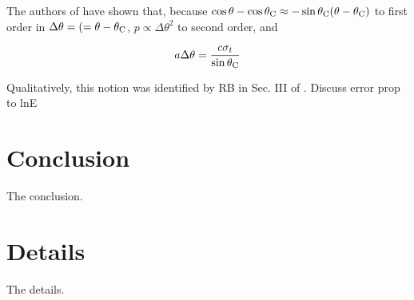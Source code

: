 \documentclass[amsmath,amssymb,aps,prd,10pt,twocolumn,showkeys]{revtex4}
\begin{document}
\begin{itemize}
The authors of \cite{PhysRevD.105.123019} have shown that, because $\cos\theta - \cos\theta_{\rm C} \approx -\sin\theta_{\rm C}(\theta-\theta_{\rm C})$ to first order in $\Delta\theta = (=\theta-\theta_{\rm C}$, $p \propto \Delta\theta^2$ to second order, and 

\begin{equation}
a\Delta\theta = \frac{c \sigma_t}{\sin\theta_{\rm C}}
\end{equation}

Qualitatively, this notion was identified by RB in Sec. III of \cite{10.1103/physrevd.65.016003}.  Discuss error prop to lnE
\end{itemize}

\section{Conclusion}
\label{sec:conc}

The conclusion.

\appendix

\section{Details}
\label{app:a}

The details.


\end{document}
